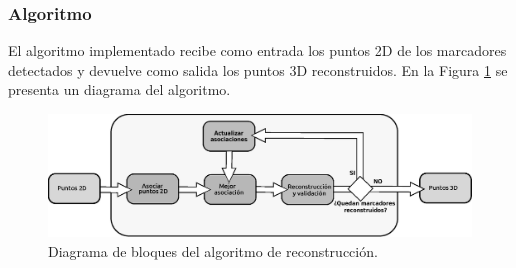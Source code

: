 \subsubsection{Algoritmo}
El algoritmo implementado recibe como entrada los puntos 2D de los marcadores detectados y devuelve como salida los puntos 3D reconstruidos. 
En la Figura \ref{fig: diagrama algoritmo} se presenta un diagrama del algoritmo.
\begin{figure}
    \begin{center}
        \includegraphics[scale=0.45]{./imagenes/Reconstruccion/bloques_reconstruccion}
        \caption{Diagrama de bloques del algoritmo de reconstrucción.}
        \label{fig: diagrama algoritmo}
    \end{center}
\end{figure}

